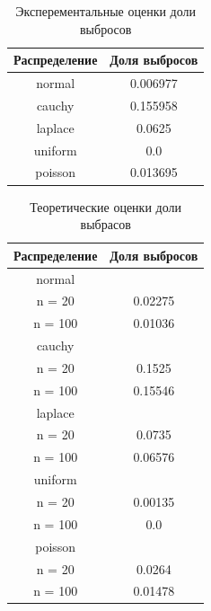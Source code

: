 \documentclass[a4]{article}
\begin{document}
\begin{center}
\begin{table}[H]
    \caption{Эксперементальные оценки доли выбросов}
    \label{tab:my_label}
    \begin{center}
    \vspace{5mm}
    \begin{tabular}{|c|c|}
    \hline
    Распределение & Доля выбросов\\
    \hline
         normal	& 0.006977\\
         \hline
cauchy & 0.155958\\
\hline
laplace	& 0.0625\\
\hline
uniform	& 0.0\\
\hline
poisson	& 0.013695\\
\hline
    \end{tabular}
    
    \end{center}
    
\end{table}

\begin{table}[H]
	
	\caption{Теоретические оценки доли выбрасов}
	\label{tab:my_label}
	\begin{center}
		\vspace{5mm}
		\begin{tabular}{|c|c|}
			\hline
			Распределение & Доля выбросов\\
			\hline
			normal	&\\
			\hline
			n = 20   & 	0.02275    \\
			\hline
			n = 100   &	0.01036    \\
			\hline
			cauchy	&\\
			\hline
			n = 20   & 	0.1525    \\
			\hline
			n = 100  & 	0.15546    \\
			\hline
			laplace	&\\
			\hline
			n = 20    &	0.0735    \\
			\hline
			n = 100   &	0.06576    \\
			\hline
			uniform	&\\
			\hline
			n = 20    &	0.00135    \\
			\hline
			n = 100   &	0.0   \\ 
			\hline
			poisson	&\\
			\hline
			n = 20   & 	0.0264    \\
			\hline
			n = 100  & 	0.01478    \\
			\hline
		\end{tabular}
		
	\end{center}
	
\end{table}

\end{center}
\end{document}
